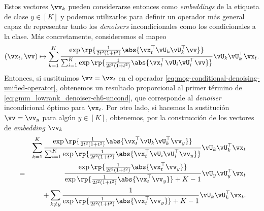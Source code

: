 \documentclass[../../book-main_es.tex]{subfiles}
\begin{document}
\begin{example}
    Estos vectores $\vv_k$ pueden considerarse entonces como \textit{embeddings} de la
    etiqueta de clase $y \in [K]$ y podemos utilizarlos para definir un operador más
    general
    capaz de representar tanto los \textit{denoisers} incondicionales como los condicionales a la clase.
    Más concretamente, consideremos el mapeo
    \begin{equation}\label{eq:mog-conditional-denoising-unified-operator}
        (\vx_t, \vv) \mapsto
        \sum_{k = 1}^{K}\frac{
            \exp\rp{\frac{1}{2t^{2}(1
            + t^{2})} \abs{\vx_t^\top \vU_k \vU_k^\top \vv}}
        }
        {
            \sum_{i
            = 1}^{K}\exp\rp{\frac{1}{2t^{2}(1
            + t^{2})}\abs{\vx_t^\top \vU_i \vU_i^\top \vv}}
        }
        \vU_{k}\vU_{k}^{\top}\vx_t.
    \end{equation}
    Entonces, si sustituimos $\vv = \vx_t$ en el operador
    \eqref{eq:mog-conditional-denoising-unified-operator}, obtenemos un resultado
    proporcional al primer término de
    \eqref{eq:gmm_lowrank_denoiser-ch6-uncond}, que corresponde al
    \textit{denoiser} incondicional óptimo para $\vx_t$.
    Por otro lado,
    si hacemos la sustitución $\vv = \vv_y$ para algún $y \in [K]$, obtenemos,
    por la construcción de los vectores de \textit{embedding} $\vv_k$
    \begin{eqnarray}
        &&\sum_{k = 1}^{K}
        \frac{
            \exp\rp{\frac{1}{2t^{2}(1
            + t^{2})}\abs{\vx_t^\top \vU_k \vU_k^\top \vv_y}}
        }
        {
            \sum_{i
            = 1}^{K}\exp\rp{\frac{1}{2t^{2}(1
            + t^{2})}\abs{\vx_t^\top \vU_i \vU_i^\top \vv_y}}
        }
        \vU_{k}\vU_{k}^{\top}\vx_t \nonumber \\
        &=&
        \frac{
            \exp\rp{\frac{1}{2t^{2}(1
            + t^{2})}\abs{\vx_t^\top \vv_y}}
        }
        {
            \exp\rp{\frac{1}{2t^{2}(1
            + t^{2})}\abs{\vx_t^\top \vv_y}}
            + K-1
        }
        \vU_{y}\vU_{y}^{\top}\vx_t
        \\
        && +
        \sum_{k \neq y}
        \frac{
            1
        }
        {
            \exp\rp{\frac{1}{2t^{2}(1
            + t^{2})}\abs{\vx_t^\top \vv_y}}
            + K-1
        }
        \vU_{k}\vU_{k}^{\top}\vx_t.
    \end{eqnarray}


\end{example}
\end{document}
